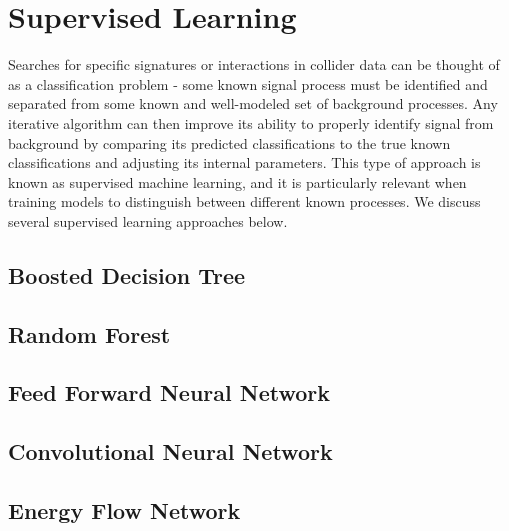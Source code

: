 \section{Supervised Learning}
\label{sec:supervised}
Searches for specific signatures or interactions in collider data can be thought of as a classification problem - some known signal process must be identified and separated from some known and well-modeled set of background processes. Any iterative algorithm can then improve its ability to properly identify signal from background by comparing its predicted classifications to the true known classifications and adjusting its internal parameters. This type of approach is known as supervised machine learning, and it is particularly relevant when training models to distinguish between different known processes. We discuss several supervised learning approaches below.

\subsection{Boosted Decision Tree}


\subsection{Random Forest}


\subsection{Feed Forward Neural Network}


\subsection{Convolutional Neural Network}



%

\subsection{Energy Flow Network}

